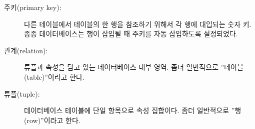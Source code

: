 \begin{description}
\item[주키(primary key):]
다른 테이블에서 테이블의 한 행을 참조하기 위해서 각 행에 대입되는 숫자 키.
종종 데이터베이스는 행이 삽입될 때 주키를 자동 삽입하도록 설정되었다.

\item[관계(relation):]
튜플과 속성을 담고 있는 데이터베이스 내부 영역. 
좀더 일반적으로 ''테이블(table)''이라고 한다.

\item[튜플(tuple):]
데이터베이스 테이블에 단일 항목으로 속성 집합이다. 좀더 일반적으로 ''행(row)''이라고 한다.

\end{description}

